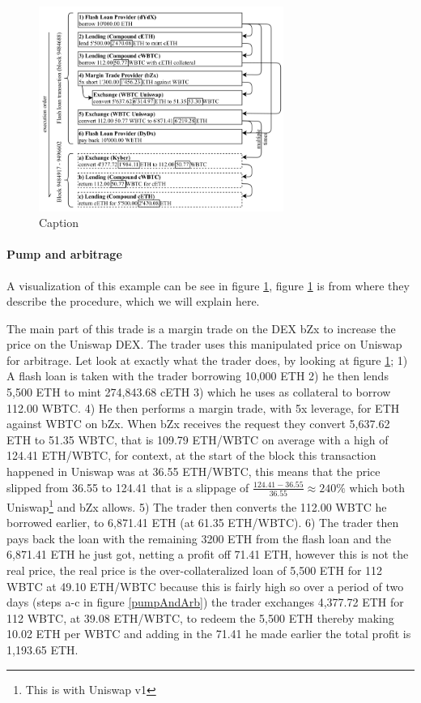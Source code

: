 \begin{figure}
  \centering
  \includegraphics[width=8cm]{assests/pump-and-arb}
  \caption{Caption}
  \label{fig:pumpAndArb}
\end{figure}
\paragraph{Pump and arbitrage} A visualization of this example can be see in figure \ref{fig:pumpAndArb}, figure \ref{fig:pumpAndArb} is from \cite{attack} where they describe the procedure, which we will explain here.

The main part of this trade is a margin trade on the DEX bZx to increase the price on the Uniswap DEX. The trader uses this manipulated price on Uniswap for arbitrage. Let look at exactly what the trader does, by looking at figure \ref{fig:pumpAndArb}; 1) A flash loan is taken with the trader borrowing 10,000 ETH 2) he then lends 5,500 ETH to mint 274,843.68 cETH 3) which he uses as collateral to borrow 112.00 WBTC. 4) He then performs a margin trade, with 5x leverage, for ETH against WBTC on bZx. When bZx receives the request they convert 5,637.62 ETH to 51.35 WBTC, that is 109.79 ETH/WBTC on average with a high of 124.41 ETH/WBTC, for context, at the start of the block this transaction happened in Uniswap was at 36.55 ETH/WBTC, this means that the price slipped from 36.55 to 124.41 that is a slippage of $\frac{124.41-36.55}{36.55}\approx 240\%$ which both Uniswap\footnote{This is with Uniswap v1} and bZx allows. 5) The trader then converts the 112.00 WBTC he borrowed earlier, to 6,871.41 ETH (at 61.35 ETH/WBTC). 6) The trader then pays back the loan with the remaining 3200 ETH from the flash loan and the 6,871.41 ETH he just got, netting a profit off 71.41 ETH, however this is not the real price, the real price is the over-collateralized loan of 5,500 ETH for 112 WBTC at 49.10 ETH/WBTC because this is fairly high so over a period of two days (steps a-c in figure \ref{pumpAndArb}) the trader exchanges 4,377.72 ETH for 112 WBTC, at 39.08 ETH/WBTC, to redeem the 5,500 ETH thereby making 10.02 ETH per WBTC and adding in the 71.41 he made earlier the total profit is 1,193.65 ETH.

